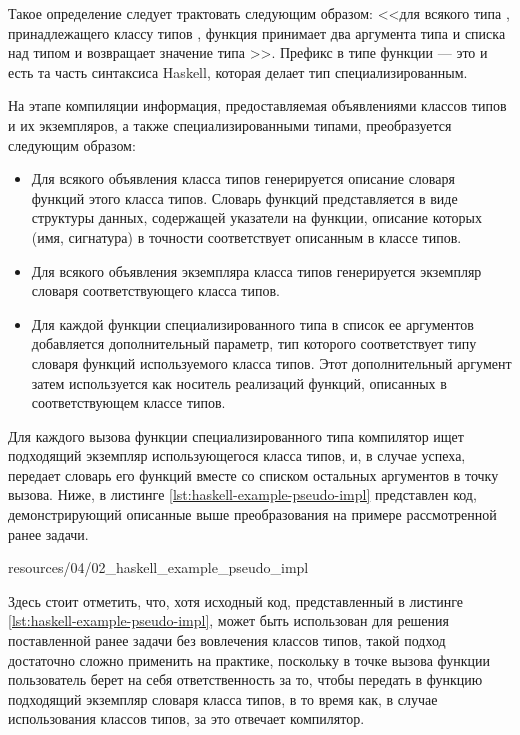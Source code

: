 Такое определение следует трактовать следующим образом: <<для всякого типа , принадлежащего классу типов , функция  принимает два аргумента типа  и списка над типом  и возвращает значение типа >>. Префикс  в типе функции  --- это и есть та часть синтаксиса Haskell, которая делает тип специализированным.

На этапе компиляции информация, предоставляемая объявлениями классов типов и их экземпляров, а также специализированными типами, преобразуется следующим образом:
\begin{itemize}
    \item Для всякого объявления класса типов генерируется описание словаря функций этого класса типов. Словарь функций представляется в виде структуры данных, содержащей указатели на функции, описание которых (имя, сигнатура) в точности соответствует описанным в классе типов. 
    \item Для всякого объявления экземпляра класса типов генерируется экземпляр словаря соответствующего класса типов. 
    \item Для каждой функции специализированного типа в список ее аргументов добавляется дополнительный параметр, тип которого соответствует типу словаря функций используемого класса типов. Этот дополнительный аргумент затем используется как носитель реализаций функций, описанных в соответствующем классе типов. 
\end{itemize}
Для каждого вызова функции специализированного типа компилятор ищет подходящий экземпляр использующегося класса типов, и, в случае успеха, передает словарь его функций вместе со списком остальных аргументов в точку вызова. Ниже, в листинге \ref{lst:haskell-example-pseudo-impl} представлен код, демонстрирующий описанные выше преобразования на примере рассмотренной ранее задачи. 


{resources/04/02_haskell_example_pseudo_impl}

Здесь стоит отметить, что, хотя исходный код, представленный в листинге \ref{lst:haskell-example-pseudo-impl}, может быть использован для решения поставленной ранее задачи без вовлечения классов типов, такой подход достаточно сложно применить на практике, поскольку в точке вызова функции  пользователь берет на себя ответственность за то, чтобы передать в функцию подходящий экземпляр словаря класса типов, в то время как, в случае использования классов типов, за это отвечает компилятор. 

